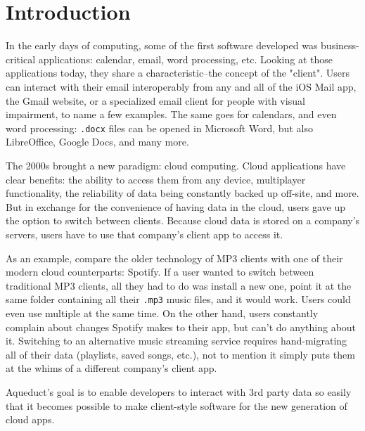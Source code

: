 \documentclass[manuscript,review,anonymous]{acmart}
\begin{document}

\maketitle

\section{Introduction}

In the early days of computing, some of the first software developed was business-critical applications: calendar, email, word processing, etc. Looking at those applications today, they share a characteristic--the concept of the "client". Users can interact with their email interoperably from any and all of the iOS Mail app, the Gmail website, or a specialized email client for people with visual impairment, to name a few examples. The same goes for calendars, and even word processing: \texttt{.docx} files can be opened in Microsoft Word, but also LibreOffice, Google Docs, and many more.

The 2000s brought a new paradigm: cloud computing. Cloud applications have clear benefits: the ability to access them from any device, multiplayer functionality, the reliability of data being constantly backed up off-site, and more. But in exchange for the convenience of having data in the cloud, users gave up the option to switch between clients. Because cloud data is stored on a company's servers, users have to use that company's client app to access it.

As an example, compare the older technology of MP3 clients with one of their modern cloud counterparts: Spotify. If a user wanted to switch between traditional MP3 clients, all they had to do was install a new one, point it at the same folder containing all their \texttt{.mp3} music files, and it would work. Users could even use multiple at the same time. On the other hand, users constantly complain about changes Spotify makes to their app, but can't do anything about it. Switching to an alternative music streaming service requires hand-migrating all of their data (playlists, saved songs, etc.), not to mention it simply puts them at the whims of a different company's client app.

Aqueduct's goal is to enable developers to interact with 3rd party data so easily that it becomes possible to make client-style software for the new generation of cloud apps.
\end{document}
